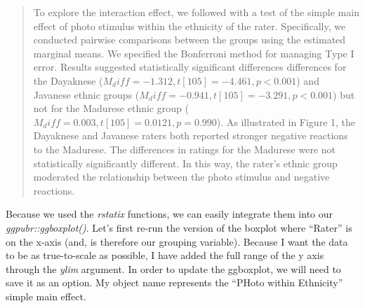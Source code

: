 \documentclass[
  11pt,
]{book}
\begin{document}
\begin{quote}
To explore the interaction effect, we followed with a test of the simple main effect of photo stimulus within the ethnicity of the rater. Specifically, we conducted pairwise comparisons between the groups using the estimated marginal means. We specified the Bonferroni method for managing Type I error. Results suggested statistically significant differences differences for the Dayaknese (\(M_diff = -1.312, t[105] = -4.461, p < 0.001\)) and Javanese ethnic groups (\(M_diff = -0.941, t[105] = -3.291, p < 0.001\)) but not for the Madurese ethnic group (\(M_diff = 0.003, t[105] = 0.0121, p = 0.990\)). As illustrated in Figure 1, the Dayaknese and Javanese raters both reported stronger negative reactions to the Madurese. The differences in ratings for the Madurese were not statistically significantly different. In this way, the rater's ethnic group moderated the relationship between the photo stimulus and negative reactions.
\end{quote}

Because we used the \emph{rstatix} functions, we can easily integrate them into our \emph{ggpubr::ggboxplot()}. Let's first re-run the version of the boxplot where ``Rater'' is on the x-axis (and, is therefore our grouping variable). Because I want the data to be as true-to-scale as possible, I have added the full range of the y axis through the \emph{ylim} argument. In order to update the ggboxplot, we will need to save it as an option. My object name represents the ``PHoto within Ethnicity'' simple main effect.
\end{document}
